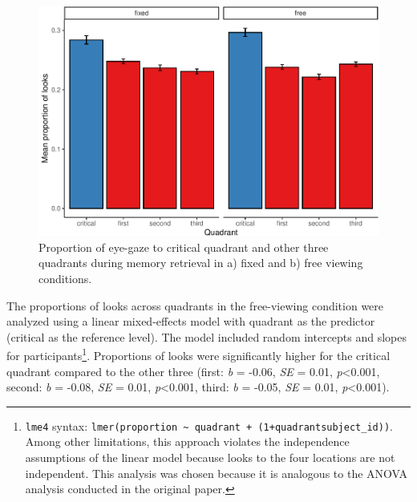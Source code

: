 \documentclass[
  man,floatsintext]{apa6}
\begin{document}
\begin{figure}
\centering
\includegraphics{manuscript_files/figure-latex/E2-gaze-fig-both-conds-1.pdf}
\caption{\label{fig:E2-gaze-fig-both-conds}Proportion of eye-gaze to critical quadrant and other three quadrants during memory retrieval in a) fixed and b) free viewing conditions.}
\end{figure}

The proportions of looks across quadrants in the free-viewing condition were analyzed using a linear mixed-effects model with quadrant as the predictor (critical as the reference level). The model included random intercepts and slopes for participants\footnote{ \texttt{lme4} syntax: \texttt{lmer(proportion\ \textasciitilde{}\ quadrant\ +\ (1+quadrant\textbar{}subject\_id))}. Among other limitations, this approach violates the independence assumptions of the linear model because looks to the four locations are not independent. This analysis was chosen because it is analogous to the ANOVA analysis conducted in the original paper.}. Proportions of looks were significantly higher for the critical quadrant compared to the other three (first: \emph{b} = -0.06, \emph{SE} = 0.01, \emph{p}\textless0.001, second: \emph{b} = -0.08, \emph{SE} = 0.01, \emph{p}\textless0.001, third: \emph{b} = -0.05, \emph{SE} = 0.01, \emph{p}\textless0.001).
\end{document}
